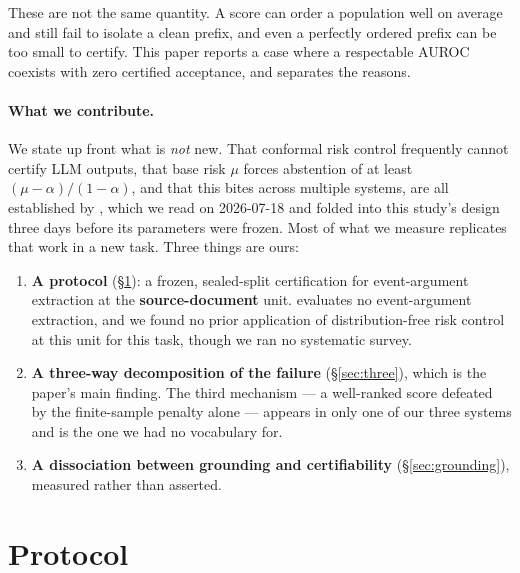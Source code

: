 \documentclass[11pt]{article}
\begin{document}
These are not the same quantity. A score can order a population well on average and still fail to
isolate a clean prefix, and even a perfectly ordered prefix can be too small to certify. This paper
reports a case where a respectable AUROC coexists with zero certified acceptance, and separates the
reasons.

\paragraph{What we contribute.}\label{sec:intro-contrib} We state up front what is \emph{not} new. That conformal risk
control frequently cannot certify LLM outputs, that base risk $\mu$ forces abstention of at least
$(\mu-\alpha)/(1-\alpha)$, and that this bites across multiple systems, are all established by
\citet{kotte2026crc}, which we read on 2026-07-18 and folded into this study's design three days
before its parameters were frozen. Most of what we measure replicates that work in a new task.
Three things are ours:

\begin{enumerate}
\item \textbf{A protocol} (\S\ref{sec:protocol}): a frozen, sealed-split certification for
  event-argument extraction at the \textbf{source-document} unit. \citet{kotte2026crc} evaluates no
  event-argument extraction, and we found no prior application of distribution-free risk control at
  this unit for this task, though we ran no systematic survey.
\item \textbf{A three-way decomposition of the failure} (\S\ref{sec:three}), which is the paper's
  main finding. The third mechanism --- a well-ranked score defeated by the finite-sample penalty
  alone --- appears in only one of our three systems and is the one we had no vocabulary for.
\item \textbf{A dissociation between grounding and certifiability} (\S\ref{sec:grounding}),
  measured rather than asserted.
\end{enumerate}

\section{Protocol}
\label{sec:protocol}
\end{document}
